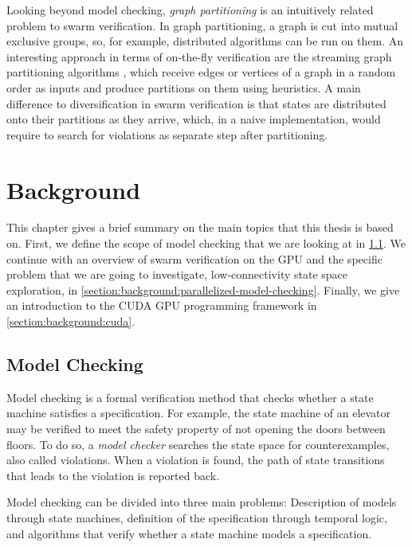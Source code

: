\documentclass[
fancyheadings, %
%
%
]{stsreprt}
\begin{document}
Looking beyond model checking, \emph{graph partitioning} is an intuitively related problem to swarm verification.
In graph partitioning, a graph is cut into mutual exclusive groups, so, for example, distributed algorithms can be run on them.
An interesting approach in terms of on-the-fly verification are the streaming graph partitioning algorithms \cite{Stanton2012}, which receive edges or vertices of a graph in a random order as inputs and produce partitions on them using heuristics.
A main difference to diversification in swarm verification is that states are distributed onto their partitions as they arrive, which, in a naive implementation, would require to search for violations as separate step after partitioning.

\chapter{Background}
\label{chapter:background}

This chapter gives a brief summary on the main topics that this thesis is based on.
First, we define the scope of model checking that we are looking at in \cref{section:background:model-checking}.
We continue with an overview of swarm verification on the GPU and the specific problem that we are going to investigate, low-connectivity state space exploration, in \cref{section:background:parallelized-model-checking}.
Finally, we give an introduction to the CUDA GPU programming framework in \cref{section:background:cuda}.

\section{Model Checking}
\label{section:background:model-checking}

Model checking is a formal verification method that checks whether a state machine satisfies a specification.
For example, the state machine of an elevator may be verified to meet the safety property of not opening the doors between floors.
To do so, a \emph{model checker} searches the state space for counterexamples, also called violations.
When a violation is found, the path of state transitions that leads to the violation is reported back.

Model checking can be divided into three main problems:
Description of models through state machines, definition of the specification through temporal logic, and algorithms that verify whether a state machine models a specification.
\end{document}
